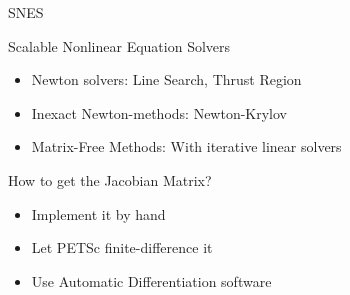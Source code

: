 

\begin{frame}{SNES}
  
  \begin{block}{Scalable Nonlinear Equation Solvers}
    \begin{itemize}
     \item Newton solvers: Line Search, Thrust Region
     \item Inexact Newton-methods: Newton-Krylov
     \item Matrix-Free Methods: With iterative linear solvers
    \end{itemize}
  \end{block}
  
  \begin{block}{How to get the Jacobian Matrix?}
    \begin{itemize}
     \item Implement it by hand
     \item Let PETSc finite-difference it
     \item Use Automatic Differentiation software
    \end{itemize}
  \end{block}
\end{frame}


